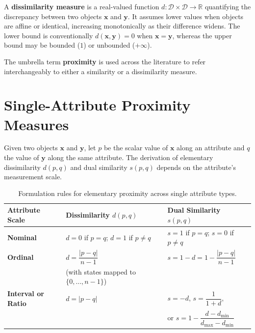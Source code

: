 \begin{definition}
A \textbf{dissimilarity measure} is a real-valued function $d: \mathcal{D} \times \mathcal{D} \to \mathbb{R}$ quantifying the discrepancy between two objects $\mathbf{x}$ and $\mathbf{y}$. It assumes lower values when objects are affine or identical, increasing monotonically as their difference widens. The lower bound is conventionally $d(\mathbf{x}, \mathbf{y}) = 0$ when $\mathbf{x} = \mathbf{y}$, whereas the upper bound may be bounded ($1$) or unbounded ($+\infty$).
\end{definition}

The umbrella term \textbf{proximity} is used across the literature to refer interchangeably to either a similarity or a dissimilarity measure.

\section{Single-Attribute Proximity Measures}
\label{sec:dm-single-attribute-proximity}

Given two objects $\mathbf{x}$ and $\mathbf{y}$, let $p$ be the scalar value of $\mathbf{x}$ along an attribute and $q$ the value of $\mathbf{y}$ along the same attribute. The derivation of elementary dissimilarity $d(p, q)$ and dual similarity $s(p, q)$ depends on the attribute's measurement scale.

\begin{table}[htbp]
\centering
\small
\begin{tabularx}{\textwidth}{lYY}
\toprule
\textbf{Attribute Scale} & \textbf{Dissimilarity $d(p, q)$} & \textbf{Dual Similarity $s(p, q)$} \\
\midrule
\textbf{Nominal} & $d = 0$ if $p = q$; \quad $d = 1$ if $p \neq q$ & $s = 1$ if $p = q$; \quad $s = 0$ if $p \neq q$ \\
\addlinespace
\textbf{Ordinal} & $d = \dfrac{|p - q|}{n - 1}$ & $s = 1 - d = 1 - \dfrac{|p - q|}{n - 1}$ \\
& {\scriptsize (with states mapped to $\{0, \dots, n-1\}$)} & \\
\addlinespace
\textbf{Interval or Ratio} & $d = |p - q|$ & $s = -d$, \quad $s = \dfrac{1}{1 + d}$, \\
& & or $s = 1 - \dfrac{d - d_{\min}}{d_{\max} - d_{\min}}$ \\
\bottomrule
\end{tabularx}
\caption{Formulation rules for elementary proximity across single attribute types.}
\label{tab:dm-single-attribute-proximity}
\end{table}

